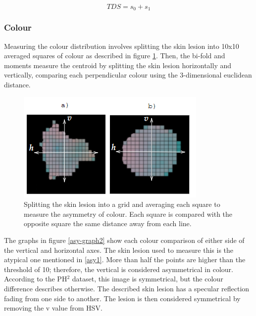 \documentclass[10.5pt]{report}
\begin{document}
\begin{equation} \label{shape3}
TDS = s_0 + s_1
\end{equation}

\subsubsection{Colour}
Measuring the colour distribution involves splitting the skin lesion into 10x10 averaged squares of colour as described in figure \ref{asy-graph1}. Then, the bi-fold and moments measure the centroid by splitting the skin lesion horizontally and vertically, comparing each perpendicular colour using the 3-dimensional euclidean distance.

\begin{figure}
\centering
\includegraphics[scale=1.2]{asym-colour.png}
\caption{Splitting the skin lesion into a grid and averaging each square to measure the asymmetry of colour. Each square is compared with the opposite square the same distance away from each line.} \label{asy-graph1}
\end{figure} 

The graphs in figure \ref{asy-graph2} show each colour comparison of either side of the vertical and horizontal axes. The skin lesion used to measure this is the atypical one mentioned in \ref{asy1}. More than half the points are higher than the threshold of 10; therefore, the vertical is considered asymmetrical in colour. According to the PH$^2$ dataset, this image is symmetrical, but the colour difference describes otherwise. The described skin lesion has a specular reflection fading from one side to another. The lesion is then considered symmetrical by removing the v value from HSV.
\end{document}
